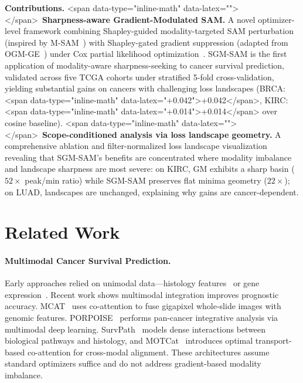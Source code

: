 \documentclass[10pt]{article}\usepackage[utf8]{inputenc}\usepackage[T1]{fontenc}\usepackage{amsmath,amssymb,amsfonts,bm}\usepackage{booktabs}\usepackage{multirow}\usepackage{array}\usepackage{graphicx}\usepackage{algorithm}\usepackage{algorithmic}\usepackage{xcolor}\usepackage[margin=1in]{geometry}\usepackage{microtype}
\begin{document}
\noindent\textbf{Contributions.}
<span data-type="inline-math" data-latex="\bullet">\bullet</span>~\textbf{Sharpness-aware Gradient-Modulated SAM.} A novel optimizer-level framework combining Shapley-guided modality-targeted SAM perturbation (inspired by M-SAM~\cite{rajoli2025msam}) with Shapley-gated gradient suppression (adapted from OGM-GE~\cite{peng2022balanced}) under Cox partial likelihood optimization~\cite{cox1972,katzman2018deepsurv}. SGM-SAM is the first application of modality-aware sharpness-seeking to cancer survival prediction, validated across five TCGA cohorts under stratified 5-fold cross-validation, yielding substantial gains on cancers with challenging loss landscapes (BRCA: <span data-type="inline-math" data-latex="+0.042">+0.042</span>, KIRC: <span data-type="inline-math" data-latex="+0.014">+0.014</span> over cosine baseline).
<span data-type="inline-math" data-latex="\bullet">\bullet</span>~\textbf{Scope-conditioned analysis via loss landscape geometry.} A comprehensive ablation and filter-normalized loss landscape visualization~\cite{li2018visualizing} revealing that SGM-SAM's benefits are concentrated where modality imbalance and landscape sharpness are most severe: on KIRC, GM exhibits a sharp basin ($52\times$ peak/min ratio) while SGM-SAM preserves flat minima geometry ($22\times$); on LUAD, landscapes are unchanged, explaining why gains are cancer-dependent.

\section{Related Work}\label{sec:related}
\paragraph{Multimodal Cancer Survival Prediction.} Early approaches relied on unimodal data---histology features~\cite{he2016resnet,lu2021clam} or gene expression~\cite{katzman2018deepsurv}. Recent work shows multimodal integration improves prognostic accuracy. MCAT~\cite{chen2021mcat} uses co-attention to fuse gigapixel whole-slide images with genomic features. PORPOISE~\cite{chen2022porpoise} performs pan-cancer integrative analysis via multimodal deep learning. SurvPath~\cite{jaume2024survpath} models dense interactions between biological pathways and histology, and MOTCat~\cite{xu2023motcat} introduces optimal transport-based co-attention for cross-modal alignment. These architectures assume standard optimizers suffice and do not address gradient-based modality imbalance.
\end{document}
